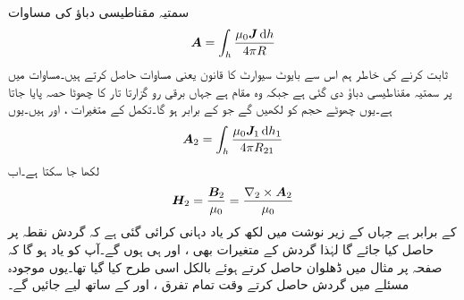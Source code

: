 سمتیہ مقناطیسی دباؤ  کی مساوات
\begin{align}\label{مساوات_مقناطیسی_سمتی_مقناطیسی_دباو_حجمی_رو_ب}
\kvec{A}=\int_h \frac{\mu_0 \kvec{J} \dif h}{4\pi R}
\end{align}
ثابت کرنے کی خاطر ہم اس سے بایوٹ سیوارٹ کا قانون یعنی مساوات   حاصل کرتے ہیں۔مساوات  میں  پر سمتیہ مقناطیسی دباؤ دی گئی ہے جبکہ  وہ مقام ہے جہاں برقی رو گزارتا تار کا چھوٹا حصہ پایا جاتا ہے۔یوں چھوٹے حجم کو  لکھیں گے جو  کے برابر ہو گا۔تکمل کے متغیرات ،  اور  ہیں۔یوں
\begin{align}\label{مساوات_مقناطیسی_سمتی_مقناطیسی_دباو_دوسرا_نقطہ}
\kvec{A}_2=\int_h \frac{\mu_0 \kvec{J}_1 \dif h_1}{4\pi R_{21}}
\end{align}
لکھا جا سکتا ہے۔اب 
\begin{align*}
{\ensuremath{{\boldsymbol{H}}}}_2=\frac{{{\boldsymbol{B}}}_2}{\mu_0}=\frac{\nabla_2 \times {\ensuremath{{\boldsymbol{A}}}}_2}{\mu_0}
\end{align*}
کے برابر ہے جہاں  کے زیر نوشت میں  لکھ کر یاد دہانی کرائی گئی ہے کہ گردش نقطہ  پر حاصل کیا جائے گا لہٰذا گردش کے متغیرات بھی ،  اور  ہی ہوں گے۔آپ کو یاد ہو گا کہ صفحہ  پر مثال  میں ڈھلوان حاصل کرتے ہوئے بالکل اسی طرح کیا گیا تھا۔یوں موجودہ مسئلے میں گردش حاصل کرتے وقت تمام تفرق ،  اور  کے ساتھ لیے جائیں گے۔

